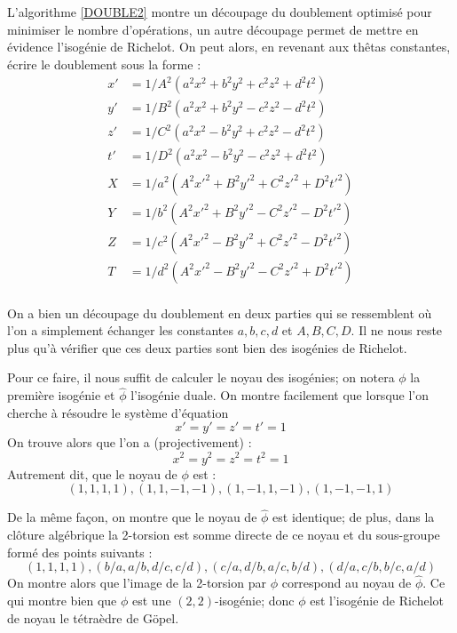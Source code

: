 \documentclass[a4paper]{article}
\theoremstyle{definition}
\theoremstyle{remark}
\numberwithin{equation}{section}
\begin{document}
L'algorithme \ref{DOUBLE2} montre un découpage du doublement optimisé pour minimiser le nombre d'opérations, un autre découpage permet de mettre en évidence l'isogénie de Richelot. On peut alors, en revenant aux thêtas constantes, écrire le doublement sous la forme : 
\begin{align*}
x' &= 1/A^2(a^2x^2 + b^2y^2 + c^2z^2 + d^2t^2) \\
y' &= 1/B^2(a^2x^2 + b^2y^2 - c^2z^2 - d^2t^2) \\
z' &= 1/C^2(a^2x^2 - b^2y^2 + c^2z^2 - d^2t^2) \\
t' &= 1/D^2(a^2x^2 - b^2y^2 - c^2z^2 + d^2t^2) \\
X &= 1/a^2(A^2x'^2 + B^2y'^2 + C^2z'^2 + D^2t'^2) \\
Y &= 1/b^2(A^2x'^2 + B^2y'^2 - C^2z'^2 - D^2t'^2) \\
Z &= 1/c^2(A^2x'^2 - B^2y'^2 + C^2z'^2 - D^2t'^2) \\
T &= 1/d^2(A^2x'^2 - B^2y'^2 - C^2z'^2 + D^2t'^2) \\
\end{align*}

On a bien un découpage du doublement en deux parties qui se ressemblent où l'on a simplement échanger les constantes $a,b,c,d$ et $A,B,C,D$. Il ne nous reste plus qu'à vérifier que ces deux parties sont bien des isogénies de Richelot.

Pour ce faire, il nous suffit de calculer le noyau des isogénies; on notera $\phi$ la première isogénie et $\hat{\phi}$ l'isogénie duale. On montre facilement que lorsque l'on cherche à résoudre le système d'équation
$$x' = y' = z' = t' = 1$$
On trouve alors que l'on a (projectivement) :
$$x^2 = y^2 = z^2 = t^2 = 1$$
Autrement dit, que le noyau de $\phi$ est :
$$(1,1,1,1),(1,1,-1,-1),(1,-1,1,-1),(1,-1,-1,1)$$

De la même façon, on montre que le noyau de $\hat{\phi}$ est identique; de plus, dans la clôture algébrique la 2-torsion est somme directe de ce noyau et du sous-groupe formé des points suivants :
$$(1,1,1,1),(b/a,a/b,d/c,c/d),(c/a,d/b,a/c,b/d),(d/a,c/b,b/c,a/d)$$
On montre alors que l'image de la 2-torsion par $\phi$ correspond au noyau de $\hat{\phi}$.
Ce qui montre bien que $\phi$ est une $(2,2)$-isogénie; donc $\phi$ est l'isogénie de Richelot de noyau le tétraèdre de G\"opel.
\end{document}
